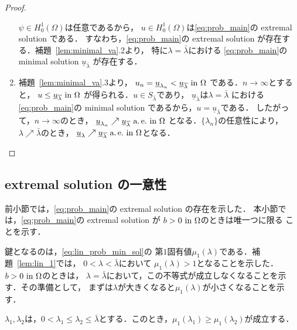\begin{proof}
\begin{enumerate}[1.]
\[        \]
        $\psi \in H_0^1(\Omega)$は任意であるから，
        $u \in H_0^1(\Omega)$は\ref{eq:prob_main}の extremal solution
        である．
        すなわち，\ref{eq:prob_main}の extremal solution
        が存在する．補題~\ref{lem:minimal_va}.2より，
        特に$\lambda = \bar{\lambda}$における
        \ref{eq:prob_main}の minimal solution 
        $\underline{u}_{\bar{\lambda}}$
        が存在する．
  \item 補題~\ref{lem:minimal_va}.3より，
        $u_n = \underline{u}_{\lambda_n} <
        \underline{u}_{\overline{\lambda}} ~\text{in}~ \Omega$
        である．$n \to \infty$とすると，
        $u \leq \underline{u}_{\overline{\lambda}} ~\text{in}~ \Omega$
        が得られる．$u \in S_{\bar{\lambda}}$であり，
        $\underline{u}_{\bar{\lambda}}$は$\lambda = \bar{\lambda}$
        における \ref{eq:prob_main}の minimal solution 
        であるから，$u = \underline{u}_{\bar{\lambda}}$である．
        したがって，$n \to \infty$のとき，
        $\underline{u}_{\lambda_n} \nearrow
        \underline{u}_{\overline{\lambda}} ~\text{a.\,e.}~ \text{in}~ \Omega$
        となる．$\{ \lambda_n \}$の任意性により，
        $\lambda \nearrow \bar{\lambda}$のとき，
        $\underline{u}_{\lambda} \nearrow
        \underline{u}_{\overline{\lambda}} ~\text{a.\,e.}~ \text{in}~ \Omega$となる．\qedhere
 \end{enumerate}
\end{proof}

\subsection{extremal solution の一意性}

前小節では，\ref{eq:prob_main}の extremal solution の存在を示した．
本小節では，\ref{eq:prob_main}の extremal solution が
$b > 0 ~\text{in}~ \Omega$のときは唯一つに限る
ことを示す．

鍵となるのは，\eqref{eq:lin_prob_min_sol}の
第$1$固有値$\mu_1(\lambda)$である．補題~\ref{lem:lin_1}では，
$0 < \lambda < \bar{\lambda}$において
$\mu_1(\lambda) > 1$となることを示した．
$b > 0 ~\text{in}~ \Omega$のときは，
$\lambda = \bar{\lambda}$において，この不等式が成立しなくなることを示
す．その準備として，
まずは$\lambda$が大きくなると$\mu_1(\lambda)$が小さくなることを示す．

\begin{lem} \label{rem:mu1_dec}
 $\lambda_1, \lambda_2$は，$0 < \lambda_1 \leq \lambda_2 \leq
 \bar{\lambda}$とする．このとき，$\mu_1(\lambda_1) \geq
 \mu_1(\lambda_2)$が成立する．
\end{lem}


